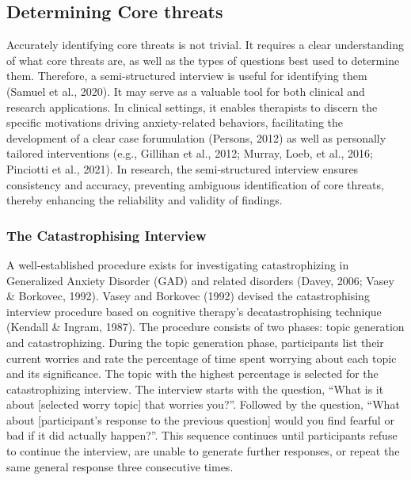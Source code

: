 \documentclass[
  man,floatsintext]{apa7}
\begin{document}
\subsection{Determining Core threats}\label{determining-core-threats}

Accurately identifying core threats is not trivial.
It requires a clear understanding of what core threats are, as well as the types of questions best used to determine them.
Therefore, a semi-structured interview is useful for identifying them (Samuel et al., 2020).
It may serve as a valuable tool for both clinical and research applications.
In clinical settings, it enables therapists to discern the specific motivations driving anxiety-related behaviors, facilitating the development of a clear case forumulation (Persons, 2012) as well as personally tailored interventions (e.g., Gillihan et al., 2012; Murray, Loeb, et al., 2016; Pinciotti et al., 2021).
In research, the semi-structured interview ensures consistency and accuracy, preventing ambiguous identification of core threats, thereby enhancing the reliability and validity of findings.

\subsubsection{The Catastrophising Interview}\label{the-catastrophising-interview}

A well-established procedure exists for investigating catastrophizing in Generalized Anxiety Disorder (GAD) and related disorders (Davey, 2006; Vasey \& Borkovec, 1992).
Vasey and Borkovec (1992) devised the catastrophising interview procedure based on cognitive therapy's decatastrophising technique (Kendall \& Ingram, 1987).
The procedure consists of two phases: topic generation and catastrophizing.
During the topic generation phase, participants list their current worries and rate the percentage of time spent worrying about each topic and its significance.
The topic with the highest percentage is selected for the catastrophizing interview.
The interview starts with the question, ``What is it about {[}selected worry topic{]} that worries you?''.
Followed by the question, ``What about {[}participant's response to the previous question{]} would you find fearful or bad if it did actually happen?''.
This sequence continues until participants refuse to continue the interview, are unable to generate further responses, or repeat the same general response three consecutive times.
\end{document}
